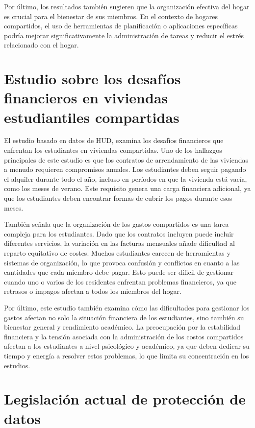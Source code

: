 \documentclass{article}
\begin{document}
Por último, los resultados también sugieren que la organización efectiva del hogar es crucial para el bienestar de sus miembros. En el contexto de hogares compartidos,
el uso de herramientas de planificación o aplicaciones específicas podría mejorar significativamente la administración de tareas y reducir el 
estrés relacionado con el hogar.

\newpage

\section{Estudio sobre los desafíos financieros en viviendas estudiantiles compartidas}
El estudio basado en datos de HUD, examina los desafíos financieros que enfrentan los estudiantes en viviendas compartidas. Uno de los hallazgos
principales de este estudio es que los contratos de arrendamiento de las viviendas a menudo requieren compromisos anuales. Los estudiantes deben 
seguir pagando el alquiler durante todo el año, incluso en períodos en que la vivienda está vacía, como los meses de verano. Este requisito genera una carga
financiera adicional, ya que los estudiantes deben encontrar formas de cubrir los pagos durante esos meses.

También señala que la organización de los gastos compartidos es una tarea compleja para los estudiantes. Dado que los contratos incluyen puede incluir 
diferentes servicios, la variación en las facturas mensuales añade dificultad al reparto equitativo de costes. Muchos estudiantes carecen de herramientas 
y sistemas de organización, lo que provoca confusión y conflictos en cuanto a las cantidades que cada miembro debe pagar. Esto puede ser 
díficil de gestionar cuando uno o varios de los residentes enfrentan problemas financieros, ya que retrasos o impagos afectan a todos los miembros del hogar.

Por último, este estudio también examina cómo las dificultades para gestionar los gastos afectan no solo la situación financiera de los estudiantes, 
sino también su bienestar general y rendimiento académico. La preocupación por la estabilidad financiera y la tensión asociada con la administración de los 
costos compartidos afectan a los estudiantes a nivel psicológico y académico, ya que deben dedicar su tiempo y energía a resolver estos problemas, lo que limita 
su concentración en los estudios.

\newpage

\section{Legislación actual de protección de datos}
\end{document}

